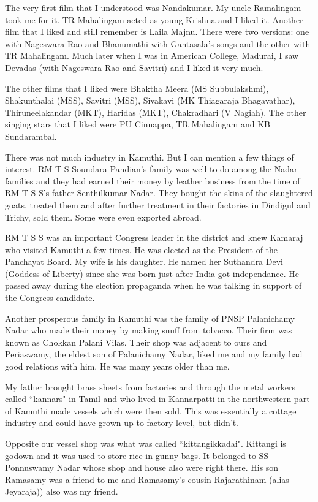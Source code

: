 The very first film that I understood was Nandakumar. My uncle 
Ramalingam took me for it. TR Mahalingam acted as young Krishna and I 
liked it. Another film that I liked and still remember is Laila Majnu. 
There were two versions: one with Nageswara Rao and Bhanumathi with 
Gantasala's songs and the other with TR Mahalingam. Much later when I 
was in American College, Madurai, I saw Devadas (with Nageswara Rao and 
Savitri) and I liked it very much.

The other films that I liked were
Bhaktha Meera (MS Subbulakshmi),
Shakunthalai (MSS),
Savitri (MSS),
Sivakavi (MK Thiagaraja Bhagavathar),
Thiruneelakandar (MKT),
Haridas (MKT),
Chakradhari (V Nagiah).
The other singing stars that I liked were PU Cinnappa, TR Mahalingam and
KB Sundarambal.

There was not much industry in Kamuthi. But I can mention a few things 
of interest. RM T S Soundara Pandian's family was well-to-do among the 
Nadar families and they had earned their money by leather business from 
the time of RM T S S's father Senthilkumar Nadar. They bought the skins 
of the slaughtered goats, treated them and after further treatment in 
their factories in Dindigul and Trichy, sold them. Some were even 
exported abroad.

RM T S S was an important Congress leader in the district and knew 
Kamaraj who visited Kamuthi a few times. He was elected as the President 
of the Panchayat Board. My wife is his daughter. He named her Suthandra 
Devi (Goddess of Liberty) since she was born just after India got 
independance. He passed away during the election propaganda when he was 
talking in support of the Congress candidate.

Another prosperous family in Kamuthi was the family of PNSP Palanichamy 
Nadar who made their money by making snuff from tobacco. Their firm was 
known as Chokkan Palani Vilas. Their shop was adjacent to ours and 
Periaswamy, the eldest son of Palanichamy Nadar, liked me and my family 
had good relations with him. He was many years older than me.

My father brought brass sheets from factories and through the metal 
workers called ``kannars" in Tamil and who lived in Kannarpatti in the 
northwestern part of Kamuthi made vessels which were then sold. This was 
essentially a cottage industry and could have grown up to factory level, 
but didn't.

Opposite our vessel shop was what was called ``kittangikkadai". Kittangi 
is godown and it was used to store rice in gunny bags. It belonged to SS 
Ponnuswamy Nadar whose shop and house also were right there. His son 
Ramasamy was a friend to me and Ramasamy's cousin Rajarathinam (alias 
Jeyaraja)) also was my friend.

